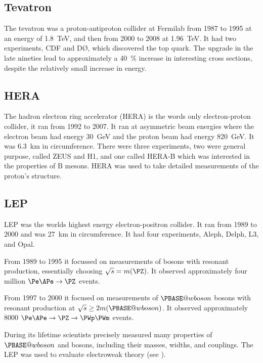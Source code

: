 \documentclass[fleqn]{NotesClass}
\makeatletter
\newcommand{\Pwboson}{\ensuremath{\PBASE@wboson}}
\newcommand{\PW}{\Pwboson}
\newcommand{\PBASE@B}{\mathrm{B}}
\newcommand{\PB}{\ensuremath{\PBASE@B}}
\makeatother
\begin{document}
    \subsection{Tevatron}
    The tevatron was a proton-antiproton collider at Fermilab from 1987 to 1995 at an energy of \qty{1.8}{\tera\electronvolt}, and then from 2000 to 2008 at \qty{1.96}{\tera\electronvolt}.
    It had two experiments, CDF and DØ, which discovered the top quark.
    The upgrade in the late nineties lead to approximately a \qty{40}{\percent} increase in interesting cross sections, despite the relatively small increase in energy.
    
    \subsection{HERA}
    The hadron electron ring accelerator (HERA) is the words only electron-proton collider, it ran from 1992 to 2007.
    It ran at asymmetric beam energies where the electron beam had energy \qty{30}{\giga\electronvolt} and the proton beam had energy \qty{820}{\giga\electronvolt}.
    It was \qty{6.3}{\kilo\metre} in circumference.
    There were three experiments, two were general purpose, called ZEUS and H1, and one called HERA-B which was interested in the properties of \PB{} mesons.
    HERA was used to take detailed measurements of the proton's structure.
    
    \subsection{LEP}
    LEP was the worlds highest energy electron-positron collider.
    It ran from 1989 to 2000 and was \qty{27}{\kilo\metre} in circumference.
    It had four experiments, Aleph, Delph, L3, and Opal.
    
    From 1989 to 1995 it focussed on measurements of \PZ{} bosons with resonant production, essentially choosing \(\sqrt{s} = m(\PZ)\).
    It observed approximately four million \(\Pe\APe \to \PZ\) events.
    
    From 1997 to 2000 it focused on measurements of \PW{} bosons with resonant production at \(\sqrt{s} \ge 2m(\PW)\).
    It observed approximately 8000 \(\Pe\APe \to \PZ \to \PWp\PWm\) events.
    
    During its lifetime scientists precisely measured many properties of \PW{} and \PZ{} bosons, including their masses, widths, and couplings.
    The LEP was used to evaluate electroweak theory (see ). %
    
\end{document}
